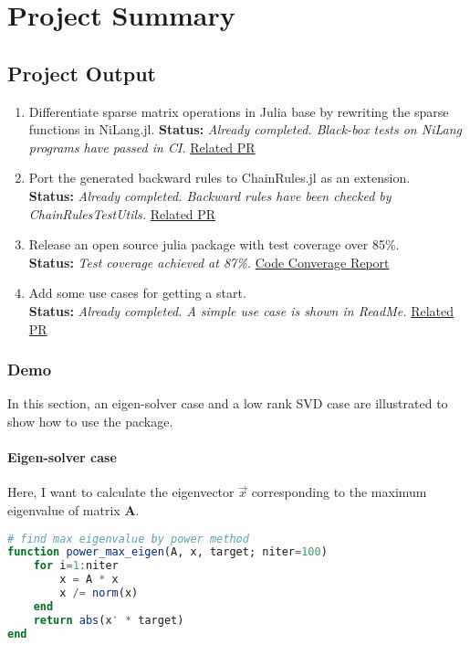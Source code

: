 
\vspace{0.5cm}  

\section{Project Summary}
\subsection{Project Output}
\begin{enumerate}[(1)]
    \item Differentiate sparse matrix operations in Julia base by rewriting the sparse functions in NiLang.jl.  
    \textbf{Status: } \textit{Already completed. Black-box tests on NiLang programs have passed in CI.}  
    \href{https://github.com/jieli-matrix/SparseArraysAD.jl/pull/20}{Related PR}
    \item Port the generated backward rules to ChainRules.jl as an extension. \\ 
    \textbf{Status: } \textit{Already completed. Backward rules have been checked by ChainRulesTestUtils.}  
    \href{https://github.com/jieli-matrix/SparseArraysAD.jl/pull/39}{Related PR}
    \item Release an open source julia package with test coverage over 85\%.  \\
    \textbf{Status: } \textit{Test coverage achieved at 87\%.} 
    \href{https://app.codecov.io/gh/jieli-matrix/SparseArraysAD.jl}{Code Converage Report} 
    \item Add some use cases for getting a start.  \\
    \textbf{Status: } \textit{Already completed. A simple use case is shown in ReadMe.}  
    \href{https://github.com/jieli-matrix/SparseArraysAD.jl/pull/34}{Related PR}
\end{enumerate}
\subsubsection{Demo}
In this section, an eigen-solver case and a low rank SVD case are illustrated to show how to use the package. 
\paragraph{Eigen-solver case} Here, I want to calculate the eigenvector $\vec{x}$ corresponding to 
the maximum eigenvalue of matrix $\mathbf{A}$. 
\begin{lstlisting}[language=Julia]
    # find max eigenvalue by power method
function power_max_eigen(A, x, target; niter=100)
    for i=1:niter
        x = A * x
        x /= norm(x)
    end
    return abs(x' * target)
end
\end{lstlisting}

